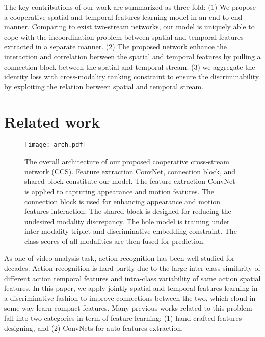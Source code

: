 \documentclass[conference,compsoc]{IEEEtran}
\begin{document}
The key contributions of our work are summarized as three-fold: (1) We propose a cooperative spatial and temporal features learning model in an end-to-end manner. Comparing to exist two-stream networks, our model is uniquely able to cope with the incoordination problem between spatial and temporal features extracted in a separate manner. (2) The proposed network enhance the interaction and correlation between the spatial and temporal features by pulling a connection block between the spatial and temporal stream. (3) we aggregate the identity loss with cross-modality ranking constraint to ensure the discriminability by exploiting the relation between spatial and temporal stream.


\section{Related work}
\label{S:2}

\begin{figure*}[t]
    \centering
    \texttt{[image: arch.pdf]}
    \caption{The overall architecture of our proposed cooperative cross-stream network (CCS). Feature extraction ConvNet, connection block, and shared block constitute our model. The feature extraction ConvNet is applied to capturing appearance and motion features. The connection block is used for enhancing appearance and motion features interaction. The shared block is designed for reducing the undesired modality discrepancy. The hole model is training under inter modality triplet and discriminative embedding constraint. The class scores of all modalities are then fused for prediction.}
    \label{fig:model}
\end{figure*}

As one of video analysis task, action recognition has been well studied for decades. Action recognition is hard partly due to the large inter-class similarity of different action temporal features and intra-class variability of same action spatial features. In this paper, we apply jointly spatial and temporal features learning in a discriminative fashion to improve connections between the two, which cloud in some way learn compact features. Many previous works related to this problem fall into two categories in term of feature learning: (1) hand-crafted features designing, and (2) ConvNets for auto-features extraction.
\end{document}
